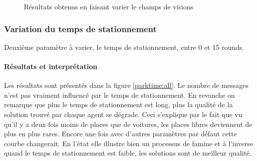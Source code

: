 \begin{figure}
\begin{center}
  \end{center}

  \caption{Résultats obtenus en faisant varier le champs de visions}
  \label{vision:all}
\end{figure}

\subsubsection{Variation du temps de stationnement}

Deuxième paramètre à varier, le temps de stationnement, entre 0 et 15 rounds.

\paragraph{Résultats et interprétation}

Les résultats sont présentés dans la figure \ref{parktime:all}.
Le nombre de messages n'est pas vraiment influencé par le temps de stationnement.
En revanche on remarque que plus le temps de stationnement est long, plus la qualité de la solution trouvé par chaque agent se dégrade. Ceci s'explique par le fait que vu qu'il y a deux fois moins de places que de voitures, les places libres deviennent de plus en plus rares. Encore une fois avec d'autres paramètres par défaut cette courbe changerait. En l'état elle illustre bien un processus de famine et à l'inverse quand le temps de stationnement est faible, les solutions sont de meilleur qualité.\\

